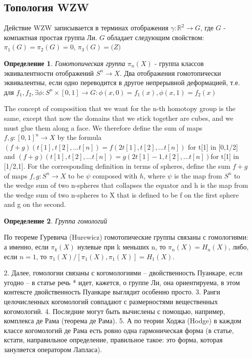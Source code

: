 \documentclass[a4paper,12pt]{article}
\theoremstyle{definition} \newtheorem{Def}{Определение}
\begin{document}
\subsection{Топология WZW}
Действие WZW записывается в терминах отображения $\gamma : \mathbb{R}^2\to G$, где $G$ - компактная простая группа Ли.
$G$ обладает следующим свойством: $\pi_1(G)=\pi_2(G)=0$, $\pi_3(G)=\mathbb(Z)$
\begin{Def}
  {\it Гомотопическая группа} $\pi_n(X)$ -  группа классов эквивалентности отображений $S^n\to X$. Два отображения гомотопически эквивалентны, если одно переводится в другое непрерывной деформацией, 
т.е. для $f_1,f_2, \exists \phi:S^n\times [0,1]\to G : \phi(x,0)=f_1(x), \phi(x,1)=f_2(x)$

The concept of composition that we want for the n-th homotopy group is the same, except that now the domains
that we stick together are cubes, and we must glue them along a face. We therefore define the sum of maps
 $f,g : [0,1]^n → X$ by the formula $(f + g)(t[1], t[2], ... t[n]) = f(2t[1], t[2], ... t[n])$ for t[1] in [0,1/2]
and $(f + g)(t[1], t[2], ... t[n]) = g(2t[1]-1, t[2], ... t[n]) $for t[1] in [1/2,1]. For the corresponding
definition in terms of spheres, define the sum $f + g$ of maps $f, g : S^n \to X$ to be $\psi$ composed with $h$, where $\psi$
is the map from $S^n$ to the wedge sum of two n-spheres that collapses the equator and h is the map from the
wedge sum of two n-spheres to X that is defined to be f on the first sphere and g on the second.

\end{Def}
\begin{Def}
  {\it Группа гомологий}
\end{Def}
\begin{list}{Homotopy-Homology}{}
\item По теореме Гуревича (Hurewicz) гомотопические группы связаны с гомологиями: а именно, если $\pi_k(X)$ нулевые при k меньших n, то $\pi_n(X)=H_n(X)$, либо, если $n=1$, то $\pi_1(X)/[\pi_1(X),\pi_1(X)]=H_1(X)$. 
\end{list}

   2. Далее, гомологии связаны с когомологиями -- двойственность Пуанкаре, если угодно -- в статье речь     
*     идет, кажется, о группе Ли, она ориентируема, в этом контексте двойственность Пуанкаре выглядит       
      особенно просто.                                                                                      
   3. Ранги целочисленных когомологий совпадают с размерностями вещественных когомологий.                   
   4. Последние могут быть вычислены с помощью, например, комплекса де Рама (теорема де Рама).              
   5. А по теории Ходжа (Hodge) в каждом классе когомологий де Рама есть ровно одна гармоническая форма (в  
      статье, кстати, направильное определение, правильное такое: это форма, которая зануляется оператором  
      Лапласа).                                                                                             
\end{document}
